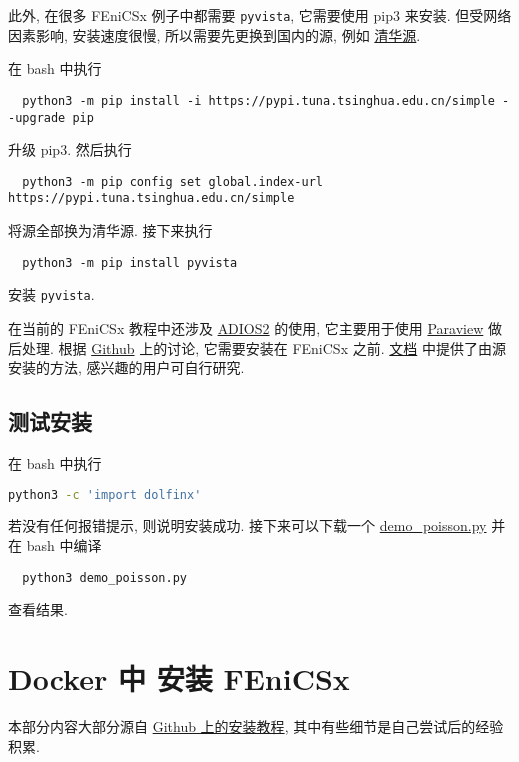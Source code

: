 \documentclass[fontset=founder]{ctexrep}
\begin{document}
此外,
在很多 FEniCSx 例子中都需要 \texttt{pyvista},
它需要使用 \textsf{pip3} 来安装.
但受网络因素影响,
安装速度很慢,
所以需要先更换到国内的源,
例如%
\href{https://mirrors.tuna.tsinghua.edu.cn/help/pypi/}{清华源}.

在 \textsf{bash} 中执行
\begin{lstlisting}
  python3 -m pip install -i https://pypi.tuna.tsinghua.edu.cn/simple --upgrade pip
\end{lstlisting}
升级 \textsf{pip3}.
然后执行
\begin{lstlisting}
  python3 -m pip config set global.index-url https://pypi.tuna.tsinghua.edu.cn/simple
\end{lstlisting}
将源全部换为清华源.
接下来执行
\begin{lstlisting}
  python3 -m pip install pyvista
\end{lstlisting}
安装 \texttt{pyvista}.

在当前的 FEniCSx 教程中还涉及
\href{https://github.com/ornladios/ADIOS2}{ADIOS2}
的使用,
它主要用于使用
\href{https://www.paraview.org/}{Paraview}
做后处理.
根据
\href{https://github.com/jorgensd/dolfinx-tutorial/issues/125#issuecomment-1502776418}{Github}
上的讨论,
它需要安装在 FEniCSx 之前.
\href{https://adios2.readthedocs.io/en/latest/setting_up/setting_up.html#}{文档}%
中提供了由源安装的方法,
感兴趣的用户可自行研究.

\section{测试安装}

在 \textsf{bash} 中执行
\begin{lstlisting}[language = bash]
  python3 -c 'import dolfinx'
\end{lstlisting}
若没有任何报错提示,
则说明安装成功.
接下来可以下载一个
\href{https://docs.fenicsproject.org/dolfinx/main/python/_downloads/b94ac7be61dc3726ca331afd20f195d2/demo_poisson.py}{demo\_poisson.py}
并在 \textsf{bash} 中编译
\begin{lstlisting}
  python3 demo_poisson.py
\end{lstlisting}
查看结果.

\chapter{Docker 中 安装 FEniCSx}

本部分内容大部分源自 \href{https://github.com/FEniCS/dolfinx#docker-images}{Github 上的安装教程},
其中有些细节是自己尝试后的经验积累.
\end{document}
